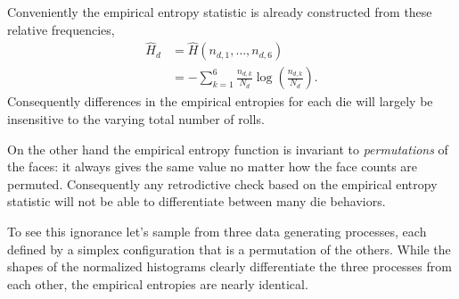 \documentclass[
  letterpaper,
  DIV=11,
  numbers=noendperiod]{scrartcl}
\begin{document}
Conveniently the empirical entropy statistic is already constructed from
these relative frequencies, \begin{align*}
\hat{H}_{d}
&=
\hat{H}(n_{d, 1}, \ldots, n_{d, 6})
\\
&=
- \sum_{k = 1}^{6}
\frac{n_{d, k}}{N_{d}} \log \left( \frac{n_{d, k}}{N_{d}} \right).
\end{align*} Consequently differences in the empirical entropies for
each die will largely be insensitive to the varying total number of
rolls.

On the other hand the empirical entropy function is invariant to
\emph{permutations} of the faces: it always gives the same value no
matter how the face counts are permuted. Consequently any retrodictive
check based on the empirical entropy statistic will not be able to
differentiate between many die behaviors.

To see this ignorance let's sample from three data generating processes,
each defined by a simplex configuration that is a permutation of the
others. While the shapes of the normalized histograms clearly
differentiate the three processes from each other, the empirical
entropies are nearly identical.
\end{document}
